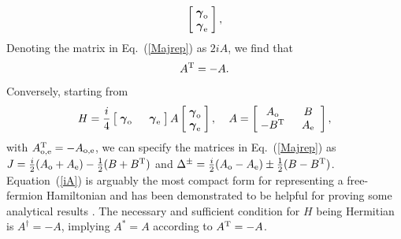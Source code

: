 \documentclass{tADP2e}
\theoremstyle{plain}
\theoremstyle{plain}
\theoremstyle{definition}
\begin{document}
\begin{appendices}
\begin{equation}
\begin{bmatrix} \;\boldsymbol{\gamma}_{\rm o}\; \\ \;\boldsymbol{\gamma}_{\rm e}\; \end{bmatrix},
\label{Majrep}
\end{equation}
Denoting the matrix in Eq.~(\ref{Majrep}) as $2iA$, we find that
\begin{equation}
A^{\rm T}=-A.
\end{equation}
Conversely, starting from 
\begin{equation}
H=\frac{i}{4}\begin{bmatrix} \;\boldsymbol{\gamma}_{\rm o}\; & \;\boldsymbol{\gamma}_{\rm e}\; \end{bmatrix} A \begin{bmatrix} \;\boldsymbol{\gamma}_{\rm o}\; \\ \;\boldsymbol{\gamma}_{\rm e}\; \end{bmatrix},\;\;\;\;A=\begin{bmatrix} \;A_{\rm o}\; & \;B\;\; \\ \;-B^{\rm T}\; & \;A_{\rm e}\;\; \end{bmatrix},
\label{iA}
\end{equation}
with $A^{\rm T}_{\rm o,e}=-A_{\rm o,e}$, we can specify the matrices in Eq.~(\ref{Majrep}) as $J=\frac{i}{2}(A_{\rm o}+A_{\rm e})-\frac{1}{2}(B+B^{\rm T})$ and $\Delta^\pm=\frac{i}{2}(A_{\rm o}-A_{\rm e})\pm\frac{1}{2}(B-B^{\rm T})$. Equation~(\ref{iA}) is arguably the most compact form for representing a free-fermion Hamiltonian and has been demonstrated to be helpful for proving some analytical results \cite{FL10}. The necessary and sufficient condition for $H$ being Hermitian is $A^\dag=-A$, implying $A^*=A$ according to $A^{\rm T}=-A$. 


\end{appendices}
\end{document}
